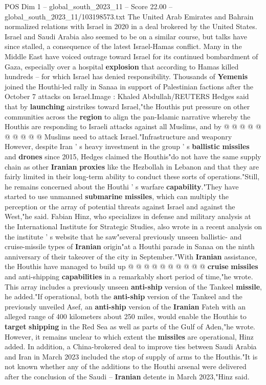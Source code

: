 \begin{textsample}{POS Dim 1 – global\_south\_2023\_11 – Score 22.00 – global\_south\_2023\_11/103198573.txt}
The United Arab Emirates and Bahrain normalized relations with Israel in 2020 in a deal brokered by the United States.
Israel and Saudi Arabia also seemed to be on a similar course, but talks have since stalled, a consequence of the latest Israel-Hamas conflict.
Many in the Middle East have voiced outrage toward Israel for its continued bombardment of Gaza, especially over a hospital \textbf{explosion} that according to Hamas killed hundreds -- for which Israel has denied responsibility.
Thousands of \textbf{Yemenis} joined the Houthi-led rally in Sanaa in support of Palestinian factions after the October 7 attacks on Israel.Image : Khaled Abdullah/REUTERS Hedges said that by \textbf{launching} airstrikes toward Israel,"the Houthis put pressure on other communities across the \textbf{region} to align the pan-Islamic narrative whereby the Houthis are responding to Israeli attacks against all Muslims, and by @ @ @ @ @ @ @ @ @ @ Muslims need to attack Israel."Infrastructure and weaponry However, despite Iran ' s heavy investment in the group ' s \textbf{ballistic} \textbf{missiles} and \textbf{drones} since 2015, Hedges claimed the Houthis"do not have the same supply chain as other \textbf{Iranian} \textbf{proxies} like the Hezbollah in Lebanon and that they are fairly limited in their long-term ability to conduct these sorts of operations."Still, he remains concerned about the Houthi ' s warfare \textbf{capability}."They have started to use unmanned \textbf{submarine} \textbf{missiles}, which can multiply the perception or the array of potential threats against Israel and against the West,"he said.
Fabian Hinz, who specializes in defense and military analysis at the International Institute for Strategic Studies, also wrote in a recent analysis on the institute ' s website that he saw"several previously unseen ballistic- and cruise-missile types of \textbf{Iranian} origin"at a Houthi parade in Sanaa on the ninth anniversary of their takeover of the city in September."With \textbf{Iranian} assistance, the Houthis have managed to build up @ @ @ @ @ @ @ @ @ @ \textbf{cruise} \textbf{missiles} and anti-shipping \textbf{capabilities} in a remarkably short period of time,"he wrote.
This array includes a previously unseen \textbf{anti-ship} version of the Tankeel \textbf{missile}, he added."If operational, both the \textbf{anti-ship} version of the Tankeel and the previously unveiled Asef, an \textbf{anti-ship} version of the \textbf{Iranian} Fateh with an alleged range of 400 kilometers about 250 miles, would enable the Houthis to \textbf{target} \textbf{shipping} in the Red Sea as well as parts of the Gulf of Aden,"he wrote.
However, it remains unclear to which extent the \textbf{missiles} are operational, Hinz added.
In addition, a China-brokered deal to improve ties between Saudi Arabia and Iran in March 2023 included the stop of supply of arms to the Houthis."It is not known whether any of the additions to the Houthi arsenal were delivered after the conclusion of the Saudi -- \textbf{Iranian} detente in March 2023,"Hinz said.


\end{textsample}
